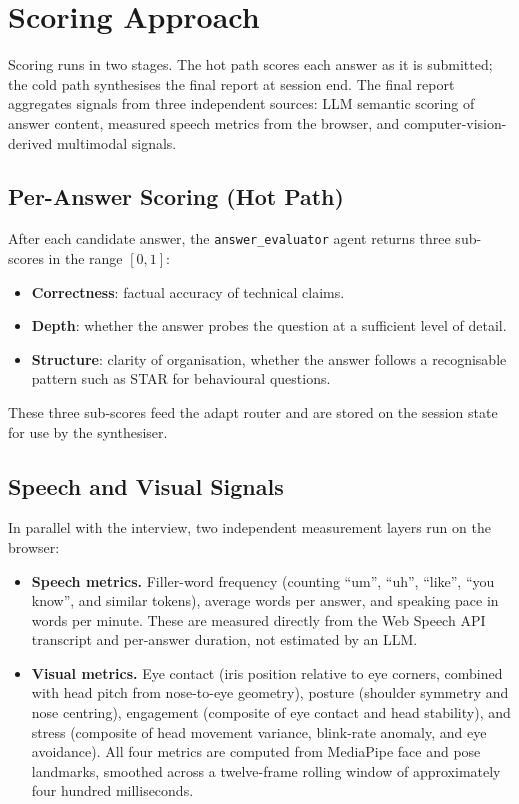 \documentclass[11pt,a4paper]{article}
\begin{document}
\section{Scoring Approach}

Scoring runs in two stages. The hot path scores each answer as it is
submitted; the cold path synthesises the final report at session end. The
final report aggregates signals from three independent sources: LLM
semantic scoring of answer content, measured speech metrics from the
browser, and computer-vision-derived multimodal signals.

\subsection{Per-Answer Scoring (Hot Path)}

After each candidate answer, the \texttt{answer\_evaluator} agent returns
three sub-scores in the range $[0, 1]$:

\begin{itemize}
  \item \textbf{Correctness}: factual accuracy of technical claims.
  \item \textbf{Depth}: whether the answer probes the question at a
        sufficient level of detail.
  \item \textbf{Structure}: clarity of organisation, whether the answer
        follows a recognisable pattern such as STAR for behavioural
        questions.
\end{itemize}

These three sub-scores feed the adapt router and are stored on the session
state for use by the synthesiser.

\subsection{Speech and Visual Signals}

In parallel with the interview, two independent measurement layers run on
the browser:

\begin{itemize}
  \item \textbf{Speech metrics.} Filler-word frequency (counting ``um'',
        ``uh'', ``like'', ``you know'', and similar tokens), average words
        per answer, and speaking pace in words per minute. These are
        measured directly from the Web Speech API transcript and
        per-answer duration, not estimated by an LLM.
  \item \textbf{Visual metrics.} Eye contact (iris position relative to
        eye corners, combined with head pitch from nose-to-eye geometry),
        posture (shoulder symmetry and nose centring), engagement
        (composite of eye contact and head stability), and stress
        (composite of head movement variance, blink-rate anomaly, and eye
        avoidance). All four metrics are computed from MediaPipe face and
        pose landmarks, smoothed across a twelve-frame rolling window of
        approximately four hundred milliseconds.
\end{itemize}
\end{document}
